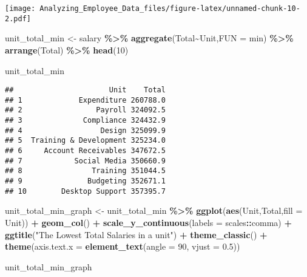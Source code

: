 \documentclass[
]{article}
\newenvironment{Shaded}{\begin{snugshade}}{\end{snugshade}}
\newcommand{\AttributeTok}[1]{\textcolor[rgb]{0.13,0.29,0.53}{#1}}
\newcommand{\DecValTok}[1]{\textcolor[rgb]{0.00,0.00,0.81}{#1}}
\newcommand{\FloatTok}[1]{\textcolor[rgb]{0.00,0.00,0.81}{#1}}
\newcommand{\FunctionTok}[1]{\textcolor[rgb]{0.13,0.29,0.53}{\textbf{#1}}}
\newcommand{\NormalTok}[1]{#1}
\newcommand{\OtherTok}[1]{\textcolor[rgb]{0.56,0.35,0.01}{#1}}
\newcommand{\SpecialCharTok}[1]{\textcolor[rgb]{0.81,0.36,0.00}{\textbf{#1}}}
\newcommand{\StringTok}[1]{\textcolor[rgb]{0.31,0.60,0.02}{#1}}
\begin{document}
\texttt{[image: Analyzing\_Employee\_Data\_files/figure-latex/unnamed-chunk-10-2.pdf]}

\begin{Shaded}
\begin{Highlighting}[]
\NormalTok{unit\_total\_min  }\OtherTok{\textless{}{-}}\NormalTok{ salary }\SpecialCharTok{\%\textgreater{}\%}
  \FunctionTok{aggregate}\NormalTok{(Total}\SpecialCharTok{\textasciitilde{}}\NormalTok{Unit,}\AttributeTok{FUN =}\NormalTok{ min) }\SpecialCharTok{\%\textgreater{}\%}
  \FunctionTok{arrange}\NormalTok{(Total) }\SpecialCharTok{\%\textgreater{}\%} \FunctionTok{head}\NormalTok{(}\DecValTok{10}\NormalTok{)}

\NormalTok{unit\_total\_min}
\end{Highlighting}
\end{Shaded}

\begin{verbatim}
##                      Unit    Total
## 1             Expenditure 260788.0
## 2                 Payroll 324092.5
## 3              Compliance 324432.9
## 4                  Design 325099.9
## 5  Training & Development 325234.0
## 6     Account Receivables 347672.5
## 7            Social Media 350660.9
## 8                Training 351044.5
## 9               Budgeting 352671.1
## 10        Desktop Support 357395.7
\end{verbatim}

\begin{Shaded}
\begin{Highlighting}[]
\NormalTok{unit\_total\_min\_graph }\OtherTok{\textless{}{-}}\NormalTok{ unit\_total\_min }\SpecialCharTok{\%\textgreater{}\%}
  \FunctionTok{ggplot}\NormalTok{(}\FunctionTok{aes}\NormalTok{(Unit,Total,}\AttributeTok{fill =}\NormalTok{ Unit)) }\SpecialCharTok{+} 
  \FunctionTok{geom\_col}\NormalTok{() }\SpecialCharTok{+}
  \FunctionTok{scale\_y\_continuous}\NormalTok{(}\AttributeTok{labels =}\NormalTok{ scales}\SpecialCharTok{::}\NormalTok{comma) }\SpecialCharTok{+} 
  \FunctionTok{ggtitle}\NormalTok{(}\StringTok{"The Lowest Total Salaries in a unit"}\NormalTok{) }\SpecialCharTok{+}  \FunctionTok{theme\_classic}\NormalTok{() }\SpecialCharTok{+} 
  \FunctionTok{theme}\NormalTok{(}\AttributeTok{axis.text.x =} \FunctionTok{element\_text}\NormalTok{(}\AttributeTok{angle =} \DecValTok{90}\NormalTok{, }\AttributeTok{vjust =} \FloatTok{0.5}\NormalTok{))}


\NormalTok{unit\_total\_min\_graph}
\end{Highlighting}
\end{Shaded}
\end{document}
